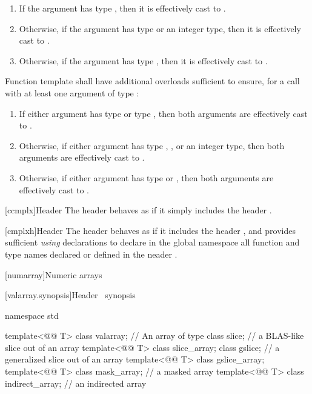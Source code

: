\documentclass[american,twoside]{book}
\begin{document}
\begin{paras}
\begin{enumerate}
        \item{If the argument has type , then it is effectively 
              cast to .}
        \item{Otherwise, if the argument has type  or an integer type,
              then it is effectively cast to .}
        \item{Otherwise, if the argument has type , then it is 
              effectively cast to .}
\end{enumerate}

\pnum
{}%
Function template  shall have additional overloads sufficient to
ensure, for a call with at least one argument of type :

\begin{enumerate}

  \item{If either argument has type  or type , then both arguments are effectively cast to
        .}
  \item{Otherwise, if either argument has type , ,
        or an integer type, then both arguments are effectively cast to
        .}
  \item{Otherwise, if either argument has type  or ,
        then both arguments are effectively cast to .}
\end{enumerate}

[ccmplx]{\marktr{}Header }
\pnum
{}%
The header behaves as if it simply includes the header .

[cmplxh]{\marktr{}Header }
\pnum
{}%
The header behaves as if it includes the header , and provides
sufficient \textit{using} declarations to declare in the global namespace all
function and type names declared or defined in the neader .

\setcounter{section}{4}
[numarray]{Numeric arrays}

[valarray.synopsis]{Header \ synopsis}
%
\begin{codeblock}
namespace std {
  template<@@ T> class valarray;         // An array of type 
  class slice;                              // a BLAS-like slice out of an array
  template<@@ T> class slice_array;
  class gslice;                             // a generalized slice out of an array
  template<@@ T> class gslice_array;
  template<@@ T> class mask_array;       // a masked array
  template<@@ T> class indirect_array;   // an indirected array

}
\end{codeblock}
\end{paras}
\end{document}

